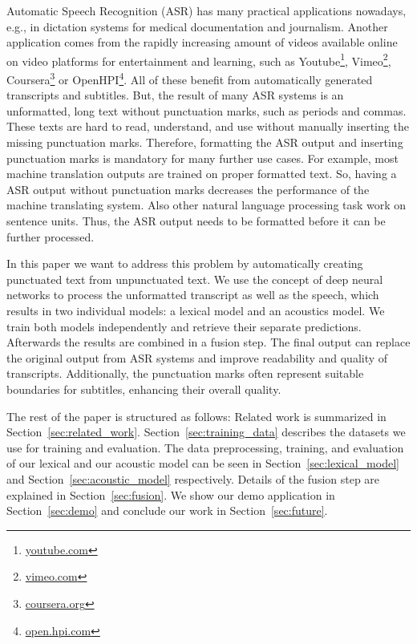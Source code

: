Automatic Speech Recognition (ASR) has many practical applications nowadays, e.g., in dictation systems for medical documentation and journalism.
Another application comes from the rapidly increasing amount of videos available online on video platforms for entertainment and learning, such as Youtube\footnote{\url{youtube.com}}, Vimeo\footnote{\url{vimeo.com}}, Coursera\footnote{\url{coursera.org}} or OpenHPI\footnote{\url{open.hpi.com}}.
All of these benefit from automatically generated transcripts and subtitles.
But, the result of many ASR systems is an unformatted, long text without punctuation marks, such as periods and commas.
These texts are hard to read, understand, and use without manually inserting the missing punctuation marks.
Therefore, formatting the ASR output and inserting punctuation marks is mandatory for many further use cases.
For example, most machine translation outputs are trained on proper formatted text.
So, having a ASR output without punctuation marks decreases the performance of the machine translating system.
Also other natural language processing task work on sentence units.
Thus, the ASR output needs to be formatted before it can be further processed.

In this paper we want to address this problem by automatically creating punctuated text from unpunctuated text.
We use the concept of deep neural networks to process the unformatted transcript as well as the speech, which results in two individual models: a lexical model and an acoustics model.
We train both models independently and retrieve their separate predictions.
Afterwards the results are combined in a fusion step.
The final output can replace the original output from ASR systems and improve readability and quality of transcripts.
Additionally, the punctuation marks often represent suitable boundaries for subtitles, enhancing their overall quality.

The rest of the paper is structured as follows:
Related work is summarized in Section~\ref{sec:related_work}.
Section~\ref{sec:training_data} describes the datasets we use for training and evaluation.
The data preprocessing, training, and evaluation of our lexical and our acoustic model can be seen in Section~\ref{sec:lexical_model} and Section~\ref{sec:acoustic_model} respectively.
Details of the fusion step are explained in Section~\ref{sec:fusion}.
We show our demo application in Section~\ref{sec:demo} and conclude our work in Section~\ref{sec:future}.
